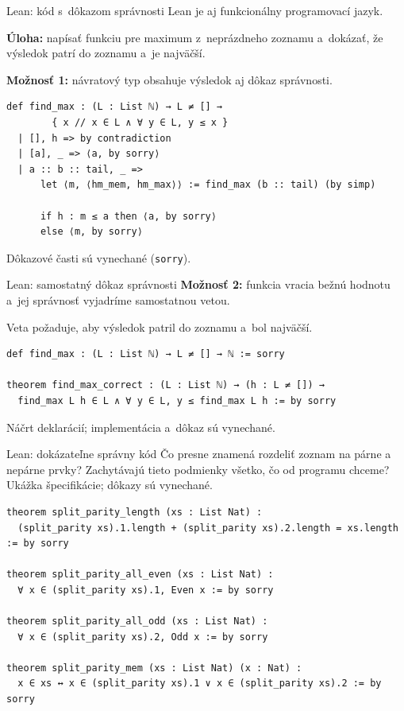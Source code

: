 \documentclass[12pt]{beamer}
\begin{document}
\begin{frame}[fragile]{Lean: kód s~dôkazom správnosti}
Lean je aj funkcionálny programovací jazyk.

\medskip
\textbf{Úloha:} napísať funkciu pre maximum z~neprázdneho zoznamu
a~dokázať, že výsledok patrí do zoznamu a~je najväčší.

\medskip
\textbf{Možnosť 1:} návratový typ obsahuje výsledok aj dôkaz správnosti.
\begin{lstlisting}[language=Lean,basicstyle=\scriptsize\ttfamily]
def find_max : (L : List ℕ) → L ≠ [] →
        { x // x ∈ L ∧ ∀ y ∈ L, y ≤ x }
  | [], h => by contradiction
  | [a], _ => ⟨a, by sorry⟩
  | a :: b :: tail, _ =>
      let ⟨m, ⟨hm_mem, hm_max⟩⟩ := find_max (b :: tail) (by simp)

      if h : m ≤ a then ⟨a, by sorry⟩
      else ⟨m, by sorry⟩
\end{lstlisting}
{\small Dôkazové časti sú vynechané (\texttt{sorry}).}
\end{frame}

\begin{frame}[fragile]{Lean: samostatný dôkaz správnosti}
\textbf{Možnosť 2:} funkcia vracia bežnú hodnotu a~jej správnosť
vyjadríme samostatnou vetou.

Veta požaduje, aby výsledok patril do zoznamu a~bol najväčší.
\begin{lstlisting}[language=Lean,basicstyle=\scriptsize\ttfamily]
def find_max : (L : List ℕ) → L ≠ [] → ℕ := sorry

theorem find_max_correct : (L : List ℕ) → (h : L ≠ []) →
  find_max L h ∈ L ∧ ∀ y ∈ L, y ≤ find_max L h := by sorry
\end{lstlisting}
{\small Náčrt deklarácií; implementácia a~dôkaz sú vynechané.}
\end{frame}

\begin{frame}[fragile]{Lean: dokázateľne správny kód}
  Čo presne znamená \alert{rozdeliť zoznam na párne a nepárne prvky}?
  Zachytávajú tieto podmienky všetko, čo od programu chceme?
  {\small Ukážka špecifikácie; dôkazy sú vynechané.}
\begin{lstlisting}[language=Lean,basicstyle=\scriptsize\ttfamily]
theorem split_parity_length (xs : List Nat) :
  (split_parity xs).1.length + (split_parity xs).2.length = xs.length := by sorry

theorem split_parity_all_even (xs : List Nat) :
  ∀ x ∈ (split_parity xs).1, Even x := by sorry

theorem split_parity_all_odd (xs : List Nat) :
  ∀ x ∈ (split_parity xs).2, Odd x := by sorry

theorem split_parity_mem (xs : List Nat) (x : Nat) :
  x ∈ xs ↔ x ∈ (split_parity xs).1 ∨ x ∈ (split_parity xs).2 := by sorry
\end{lstlisting}
\end{frame}
\end{document}
